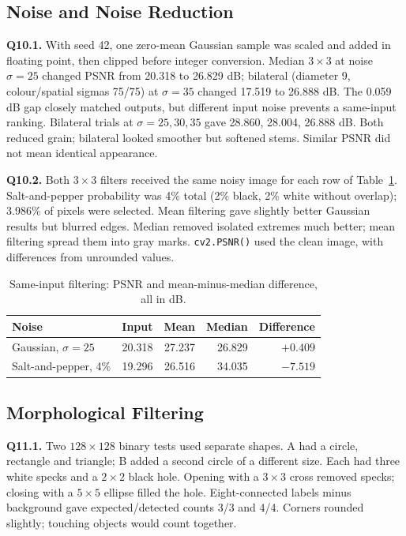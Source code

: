 \documentclass[10pt,a4paper]{article}
\begin{document}
\subsection{Noise and Noise Reduction}
\textbf{Q10.1.} With seed 42, one zero-mean Gaussian sample was scaled and added
in floating point, then clipped before integer conversion. Median \(3\times3\)
at noise \(\sigma=25\) changed PSNR from 20.318 to 26.829 dB; bilateral
(diameter 9, colour/spatial sigmas 75/75) at \(\sigma=35\) changed 17.519 to
26.888 dB. The 0.059 dB gap closely matched outputs, but different input noise
prevents a same-input ranking. Bilateral trials at \(\sigma=25,30,35\) gave
28.860, 28.004, 26.888 dB. Both reduced grain; bilateral looked smoother but
softened stems. Similar PSNR did not mean identical appearance.

\textbf{Q10.2.} Both \(3\times3\) filters received the same noisy image for each
row of Table~\ref{tab:noise}. Salt-and-pepper probability was 4\% total
(2\% black, 2\% white without overlap); 3.986\% of pixels were selected.
Mean filtering gave slightly better Gaussian results but blurred edges.
Median removed isolated extremes much better; mean filtering spread them
into gray marks. \texttt{cv2.PSNR()} used the clean image, with differences from unrounded values.

\begin{table}[H]
\centering
\caption{Same-input filtering: PSNR and mean-minus-median difference, all in dB.}
\label{tab:noise}
\begin{tabular}{lrrrr}\toprule
Noise & Input & Mean & Median & Difference\\\midrule
Gaussian, \(\sigma=25\) & 20.318 & 27.237 & 26.829 & \(+0.409\)\\
Salt-and-pepper, 4\% & 19.296 & 26.516 & 34.035 & \(-7.519\)\\\bottomrule
\end{tabular}
\end{table}

\subsection{Morphological Filtering}
\textbf{Q11.1.} Two \(128\times128\) binary tests used separate shapes.
A had a circle, rectangle and triangle; B added a second circle of a different
size. Each had three white specks and a \(2\times2\) black hole. Opening with a
\(3\times3\) cross removed specks; closing with a \(5\times5\) ellipse filled
the hole. Eight-connected labels minus background gave expected/detected counts
3/3 and 4/4. Corners rounded slightly; touching objects would count together.
\end{document}
